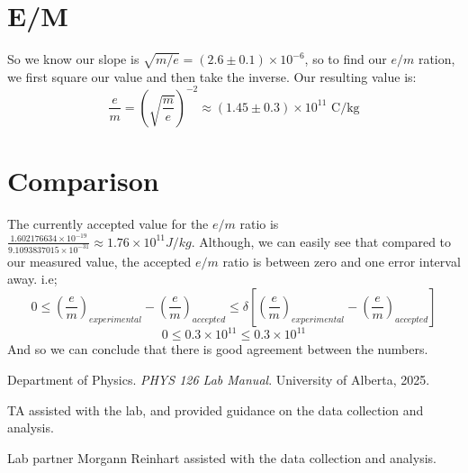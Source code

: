 \documentclass[12pt]{article}
\begin{document}
\section{E/M}
So we know our slope is $\sqrt{m/e} = (2.6 \pm 0.1) \times 10^{-6}$, so to find our $e/m$ ration,
we first square our value and then take the inverse. Our resulting value is:
\begin{equation*}
    \frac{e}{m} = \left(\sqrt{\frac{m}{e}}\right)^{-2}\approx (1.45 \pm 0.3) \times 10^{11} \text{ C/kg}
\end{equation*}
\section{Comparison}
The currently accepted value for the $e/m$ ratio is $\frac{1.602176634 \times 10^{-19}}{9.1093837015 \times 10^{-31}} \approx 1.76 \times 10^{11} J/kg$.
Although, we can easily see that compared to our measured value, the accepted $e/m$ ratio is between zero and one error interval away.
i.e;
\begin{equation*}
    0 \le \left(\frac{e}{m}\right)_{experimental} - \left(\frac{e}{m}\right)_{accepted} \le \delta\left[\left(\frac{e}{m}\right)_{experimental} - \left(\frac{e}{m}\right)_{accepted}\right]
\end{equation*} 
\begin{equation*}
    0 \le 0.3 \times 10^{11} \le 0.3 \times 10^{11}
\end{equation*}
And so we can conclude that there is good agreement between the numbers.
\renewcommand{\bibname}{5\ \ \References and Acknowledgements}
\begin{thebibliography}{9}
    Department of Physics. \textit{PHYS 126 Lab Manual}. University of Alberta, 2025.

    TA assisted with the lab, and provided guidance on the data collection and analysis.

    Lab partner Morgann Reinhart assisted with the data collection and analysis.
    
\end{thebibliography}
\end{document}
